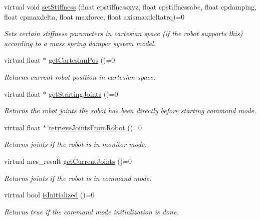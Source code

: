 \begin{DoxyCompactItemize}
virtual void \hyperlink{classControlQueue_ad6d5bccd9d08d40d5464f10a958e5328}{set\-Stiffness} (float cpstiffnessxyz, float cpstiffnessabc, float cpdamping, float cpmaxdelta, float maxforce, float axismaxdeltatrq)=0
\begin{DoxyCompactList}\small\item\em \-Sets certain stiffness parameters in cartesian space (if the robot supports this) according to a mass spring damper system model. \end{DoxyCompactList}\item 
virtual float $\ast$ \hyperlink{classControlQueue_a9bdc3efe662d9d275d48ec523627ef7c}{get\-Cartesian\-Pos} ()=0
\begin{DoxyCompactList}\small\item\em \-Returns current robot position in cartesian space. \end{DoxyCompactList}\item 
virtual float $\ast$ \hyperlink{classControlQueue_a4b8c95e38791477bf925ac8f61c38821}{get\-Starting\-Joints} ()=0
\begin{DoxyCompactList}\small\item\em \-Returns the robot joints the robot has been directly before starting command mode. \end{DoxyCompactList}\item 
virtual float $\ast$ \hyperlink{classControlQueue_a7b803a4b12bfa70c79fdad108e63b0f4}{retrieve\-Joints\-From\-Robot} ()=0
\begin{DoxyCompactList}\small\item\em \-Returns joints if the robot is in monitor mode. \end{DoxyCompactList}\item 
virtual mes\-\_\-result \hyperlink{classControlQueue_aa610fa7b8b53ed7c406eba1fa4eb106c}{get\-Current\-Joints} ()=0
\begin{DoxyCompactList}\small\item\em \-Returns joints if the robot is in command mode. \end{DoxyCompactList}\item 
virtual bool \hyperlink{classControlQueue_a153ff04f335b33580d15d2e16f17265b}{is\-Initialized} ()=0
\begin{DoxyCompactList}\small\item\em \-Returns true if the command mode initialization is done. \end{DoxyCompactList}\end{DoxyCompactItemize}


